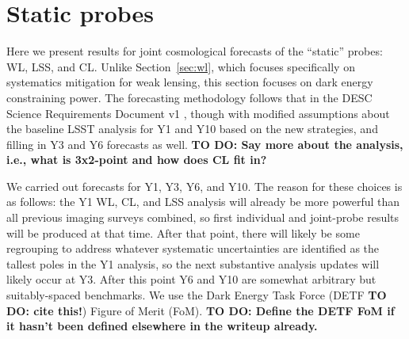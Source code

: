 \section{Static probes}

\newcommand{\todorm}[1]{\textbf{TO DO: #1}}

Here we present results for joint cosmological forecasts of the ``static'' probes: WL, LSS, and CL.
Unlike Section~\ref{sec:wl}, which focuses specifically on systematics mitigation for weak lensing,
this section focuses on dark energy constraining power.  The forecasting methodology follows
that in the DESC Science Requirements Document v1 \cite{DESCSRD2018}, though with modified
assumptions about the baseline LSST analysis for Y1 and Y10 based on the new strategies, and filling
in Y3 and Y6 forecasts as well. 
\todorm{Say more about the analysis, i.e., what is 3x2-point and how does CL fit in?}

We carried out forecasts for Y1, Y3, Y6, and Y10.  The reason for these choices is as follows: the
Y1 WL, CL, and LSS analysis will already be more powerful than all previous imaging surveys
combined, so first individual and joint-probe results will be produced at that time.  After that
point, there will likely be some regrouping to address whatever systematic uncertainties are
identified as the tallest poles in the Y1 analysis, so the next substantive analysis updates will
likely occur at Y3.  After this point Y6 and Y10 are somewhat arbitrary but suitably-spaced
benchmarks.  We use the Dark Energy Task Force (DETF \todorm{cite this!}) Figure of Merit
(FoM). \todorm{Define the DETF FoM if it hasn't been defined elsewhere in the writeup already.}

